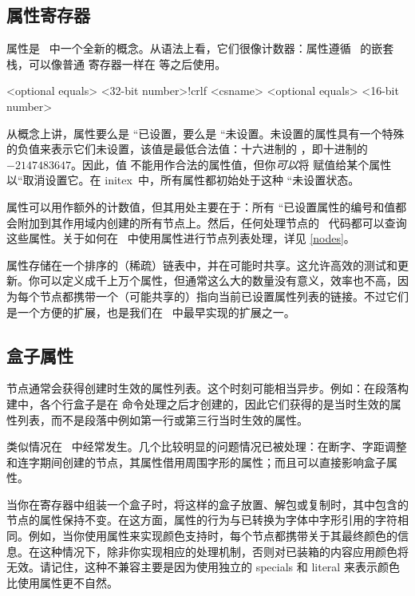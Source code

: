 \subsection{属性寄存器}


属性是 \LUATEX\ 中一个全新的概念。从语法上看，它们很像计数器：属性遵循 \TEX\ 的嵌套栈，可以像普通  寄存器一样在  等之后使用。

\begin{typing}
 <optional equals> <32-bit number>!crlf
\attributedef <csname> <optional equals> <16-bit number>
\end{typing}

从概念上讲，属性要么是 ``已设置，要么是 ``未设置。未设置的属性具有一个特殊的负值来表示它们未设置，该值是最低合法值：十六进制的 ，即十进制的 $-2147483647$。因此，值  不能用作合法的属性值，但你{\it 可以\/}将  赋值给某个属性以``取消设置它。在 initex\ 中，所有属性都初始处于这种 ``未设置状态。

属性可以用作额外的计数值，但其用处主要在于：所有 ``已设置属性的编号和值都会附加到其作用域内创建的所有节点上。然后，任何处理节点的 \LUA\ 代码都可以查询这些属性。关于如何在 \LUA\ 中使用属性进行节点列表处理，详见 \ref{nodes}。

属性存储在一个排序的（稀疏）链表中，并在可能时共享。这允许高效的测试和更新。你可以定义成千上万个属性，但通常这么大的数量没有意义，效率也不高，因为每个节点都携带一个（可能共享的）指向当前已设置属性列表的链接。不过它们是一个方便的扩展，也是我们在 \LUATEX\ 中最早实现的扩展之一。

\subsection{盒子属性}


节点通常会获得创建时生效的属性列表。这个时刻可能相当异步。例如：在段落构建中，各个行盒子是在  命令处理之后才创建的，因此它们获得的是当时生效的属性列表，而不是段落中例如第一行或第三行当时生效的属性。

类似情况在 \LUATEX\ 中经常发生。几个比较明显的问题情况已被处理：在断字、字距调整和连字期间创建的节点，其属性借用周围字形的属性；而且可以直接影响盒子属性。

当你在寄存器中组装一个盒子时，将这样的盒子放置、解包或复制时，其中包含的节点的属性保持不变。在这方面，属性的行为与已转换为字体中字形引用的字符相同。例如，当你使用属性来实现颜色支持时，每个节点都携带关于其最终颜色的信息。在这种情况下，除非你实现相应的处理机制，否则对已装箱的内容应用颜色将无效。请记住，这种不兼容主要是因为使用独立的 specials 和 literal 来表示颜色比使用属性更不自然。

